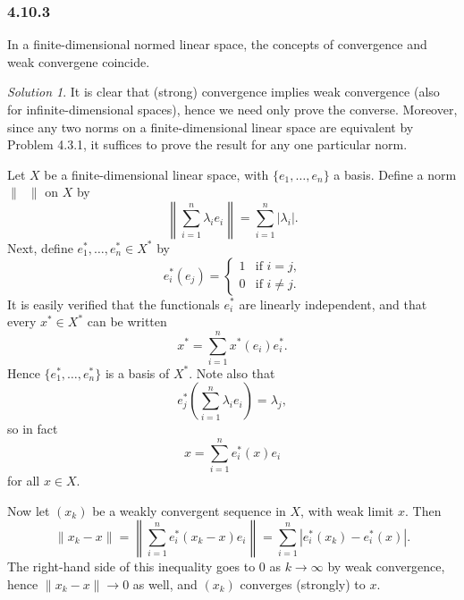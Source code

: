 \documentclass{report}
\newcommand{\norm}[1]{{\lVert #1 \rVert}}
\newcommand{\snorm}[1]{\left\lVert #1 \right\rVert}
\theoremstyle{remark}
\newtheorem*{solution}{Solution}
\begin{document}
\subsubsection*{4.10.3}
In a finite-dimensional normed linear space, the concepts of convergence and weak convergene coincide.

\begin{solution}
  It is clear that (strong) convergence implies weak convergence (also for infinite-dimensional spaces), hence we need only prove the converse. Moreover, since any two norms on a finite-dimensional linear space are equivalent by Problem 4.3.1, it suffices to prove the result for any one particular norm.

  Let $X$ be a finite-dimensional linear space, with $\{e_1, \dots, e_n\}$ a basis. Define a norm $\norm{\phantom x}$ on $X$ by
  \begin{equation*}
    \snorm{\sum_{i=1}^n \lambda_i e_i} = \sum_{i=1}^n |\lambda_i|.
  \end{equation*}
  Next, define $e_1^*, \dots, e_n^* \in X^*$ by
  \begin{equation*}
    e_i^*(e_j) =
    \begin{cases}
      1 & \text{if $i=j$,} \\
      0 & \text{if $i \ne j$.}
    \end{cases}
  \end{equation*}
  It is easily verified that the functionals $e_i^*$ are linearly independent, and that every $x^* \in X^*$ can be written
  \begin{equation*}
    x^* = \sum_{i=1}^n x^*(e_i) e_i^*.
  \end{equation*}
  Hence $\{e_1^*, \dots, e_n^*\}$ is a basis of $X^*$. Note also that
  \begin{equation*}
    e_j^* \left( \sum_{i=1}^n \lambda_i e_i \right) = \lambda_j,
  \end{equation*}
  so in fact 
  \begin{equation*}
    x = \sum_{i=1}^n e_i^*(x) e_i
  \end{equation*}
  for all $x \in X$.

  Now let $(x_k)$ be a weakly convergent sequence in $X$, with weak limit $x$. Then
  \begin{equation*}
    \norm{x_k - x} = \snorm{\sum_{i=1}^n e_i^*(x_k - x) e_i} = \sum_{i=1}^n |e_i^*(x_k) - e_i^*(x)|.
  \end{equation*}
  The right-hand side of this inequality goes to 0 as $k \to \infty$ by weak convergence, hence $\norm{x_k - x} \to 0$ as well, and $(x_k)$ converges (strongly) to $x$.
\end{solution}
\end{document}
